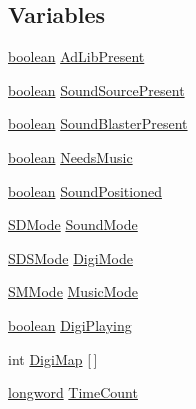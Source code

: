 \subsection*{Variables}
\begin{DoxyCompactItemize}
\item 
\hyperlink{ID__HEAD_8H_a7c6368b321bd9acd0149b030bb8275ed}{boolean} \hyperlink{ID__SD_8H_aae5cf4d134b52966bc2aa3de22b0dd03}{AdLibPresent}
\item 
\hyperlink{ID__HEAD_8H_a7c6368b321bd9acd0149b030bb8275ed}{boolean} \hyperlink{ID__SD_8H_ad1e0e8f0ed866e2473d8915e769852c5}{SoundSourcePresent}
\item 
\hyperlink{ID__HEAD_8H_a7c6368b321bd9acd0149b030bb8275ed}{boolean} \hyperlink{ID__SD_8H_a339e21cdf208764078f89b5b5f72932b}{SoundBlasterPresent}
\item 
\hyperlink{ID__HEAD_8H_a7c6368b321bd9acd0149b030bb8275ed}{boolean} \hyperlink{ID__SD_8H_aa073cdf1c0836ab07a66b9e73bfe89cd}{NeedsMusic}
\item 
\hyperlink{ID__HEAD_8H_a7c6368b321bd9acd0149b030bb8275ed}{boolean} \hyperlink{ID__SD_8H_a99325c606c4f55b472ccc411b1b2bb02}{SoundPositioned}
\item 
\hyperlink{ID__SD_8H_af66c128f54042fe02b7297e3e29a8b6d}{SDMode} \hyperlink{ID__SD_8H_ae78ec490e7f5cbb26c649cc4034546f7}{SoundMode}
\item 
\hyperlink{ID__SD_8H_a5d22d74f0369393939a5d3cf1dcfdaf3}{SDSMode} \hyperlink{ID__SD_8H_ad359668c13523a90cddba7728a33fab9}{DigiMode}
\item 
\hyperlink{ID__SD_8H_ac43ff64e0d1da85aa6fee6723a38a4de}{SMMode} \hyperlink{ID__SD_8H_afcbed1bc96a4997c02b2eb0143c57ba5}{MusicMode}
\item 
\hyperlink{ID__HEAD_8H_a7c6368b321bd9acd0149b030bb8275ed}{boolean} \hyperlink{ID__SD_8H_a11b9e79724767ea7fe4429444baa39c0}{DigiPlaying}
\item 
int \hyperlink{ID__SD_8H_a457a57338904d39467e312608908007c}{DigiMap} \mbox{[}$\,$\mbox{]}
\item 
\hyperlink{ID__HEAD_8H_a8a9a7dd50c6fdb45dcdf0eb929479663}{longword} \hyperlink{ID__SD_8H_afae310dc5c7e77f2742ddbfc16b98dd0}{TimeCount}
\end{DoxyCompactItemize}


